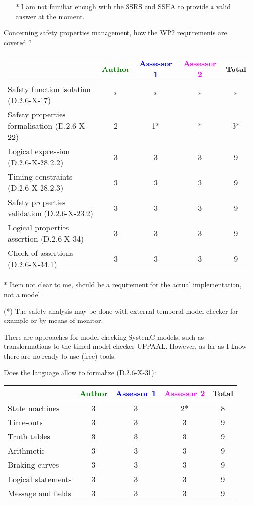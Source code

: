 \begin{assessor2}
  \begin{itemize}
  \item[*] I am not familiar enough with the SSRS and SSHA to provide a
    valid answer at the moment.
  \end{itemize}  
\end{assessor2}


Concerning safety properties management, how the WP2 requirements are covered ?

\begin{tabular}{|l | c | c | c | c|}
\hline
& \textcolor{green}{Author} & \textcolor{blue}{Assessor 1} & \textcolor{magenta}{Assessor 2} & Total \\
\hline
Safety function isolation (D.2.6-X-17) &* & * & * & * \\
\hline
Safety properties formalisation (D.2.6-X-22) &2 &1* & * & 3* \\
\hline
Logical expression (D.2.6-X-28.2.2) &3 &3 &3 & 9  \\
\hline
Timing constraints (D.2.6-X-28.2.3) &3 &3 &3 & 9 \\
\hline
Safety properties validation (D.2.6-X-23.2) &3 &3 &3 & 9 \\
\hline
Logical properties assertion (D.2.6-X-34) &3 &3 &3 & 9 \\
\hline
Check of assertions (D.2.6-X-34.1) &3 &3 &3 & 9 \\
\hline
\end{tabular}


\begin{author_comment}
* Item not clear to me, should be a requirement for the actual implementation, not a model
\end{author_comment}

\begin{assessor1}
(*) The safety analysis may be done with external temporal model
checker for example or by means of monitor. 
\begin{author_comment}
There are approaches for model checking SystemC models, such as transformations to the timed model checker UPPAAL. However, as far as I know there are no ready-to-use (free) tools.
\end{author_comment}
\end{assessor1}
Does the language allow to formalize (D.2.6-X-31):

\begin{tabular}{|l | c | c | c | c|}
\hline
& \textcolor{green}{Author} & \textcolor{blue}{Assessor 1} & \textcolor{magenta}{Assessor 2} & Total \\
\hline
State machines &3 &3 & 2* & 8 \\
\hline
Time-outs &3 &3 &3 & 9 \\
\hline
Truth tables &3 &3 &3 & 9 \\
\hline
Arithmetic &3 &3 &3 & 9 \\
\hline
Braking curves &3 &3 &3 & 9 \\
\hline
Logical statements &3 &3 &3 & 9 \\
\hline
Message and fields &3 &3 &3 & 9 \\
\hline
\end{tabular}

